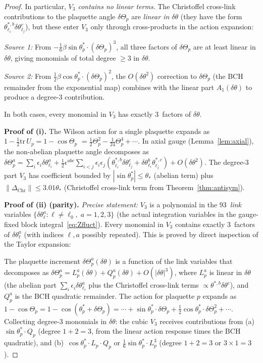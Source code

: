 \documentclass[11pt]{article}
\theoremstyle{definition}
\newcommand{\tr}{\mathrm{tr}}
\begin{document}
\begin{proof}
In particular, \emph{$V_3$ contains no linear terms}.
The Christoffel cross-link contributions to the plaquette angle
$\delta\Theta_p$ are \emph{linear in $\delta\theta$}
(they have the form $\theta^{*,b}_{\ell_i}\delta\theta^c_{\ell_j}$),
but these enter $V_3$ only through cross-products in the action
expansion:

\emph{Source 1:} From
$-\tfrac{1}{6}\beta\sin\theta_p^*\cdot(\delta\Theta_p)^3$,
all three factors of $\delta\Theta_p$ are at least linear in
$\delta\theta$, giving monomials of total degree $\ge 3$ in
$\delta\theta$.

\emph{Source 2:} From
$\tfrac{1}{2}\beta\cos\theta_p^*\cdot(\delta\Theta_p)^2$,
the $O(\delta\theta^2)$ correction to
$\delta\Theta_p$ (the BCH remainder from the exponential map)
combines with the linear part $A_1(\delta\theta)$ to produce
a degree-3 contribution.

In both cases, every monomial in $V_3$ has exactly 3~factors of
$\delta\theta$.

\textbf{Proof of (i).}
The Wilson action for a single plaquette expands as
$1-\frac{1}{2}\tr\,U_p=1-\cos\Theta_p$
$=\frac{1}{2}\Theta_p^2-\frac{1}{24}\Theta_p^4+\cdots$.
In axial gauge (Lemma~\ref{lem:axial}), the non-abelian plaquette
angle decomposes as
$\delta\Theta_p^a=\sum_i\epsilon_i\delta\theta_{\ell_i}^a
+\frac{1}{2}\epsilon^{abc}\sum_{i<j}\epsilon_i\epsilon_j
(\theta_{\ell_i}^{*,b}\delta\theta_{\ell_j}^c
+\delta\theta_{\ell_i}^b\theta_{\ell_j}^{*,c})
+O(\delta\theta^2)$.
The degree-3 part $V_3$ has coefficient bounded by
$|\sin\theta_p^*|\le\theta_*$ (abelian term) plus
$\|\Delta_{\mathrm{Chr}}\|\le 3.01\theta_*$ (Christoffel cross-link
term from Theorem~\ref{thm:antisym}).

\textbf{Proof of (ii) (parity).}
\emph{Precise statement:} $V_3$ is a polynomial in the
93~\emph{link} variables
$\{\delta\theta_\ell^a:\ell\ne\ell_0,\;a=1,2,3\}$ (the
actual integration variables in the gauge-fixed block
integral~\eqref{eq:Zfluct}).  Every monomial in $V_3$
contains exactly 3~factors of $\delta\theta_\ell^a$ (with
indices $\ell,a$ possibly repeated).  This is proved
by direct inspection of the Taylor expansion:

The plaquette increment
$\delta\Theta_p^a(\delta\theta)$ is a function of the link
variables that decomposes as
$\delta\Theta_p^a=L_p^a(\delta\theta)+Q_p^a(\delta\theta)
+O(|\delta\theta|^3)$,
where $L_p^a$ is linear in $\delta\theta$ (the abelian part
$\sum_i\epsilon_i\delta\theta_{\ell_i}^a$ plus the
Christoffel cross-link terms
$\propto\theta^{*,b}\delta\theta^c$), and $Q_p^a$ is the
BCH quadratic remainder.  The action for plaquette $p$ expands as
$1-\cos\Theta_p=1-\cos(\theta_p^*+\delta\Theta_p)
=\cdots+\sin\theta_p^*\cdot\delta\Theta_p
+\frac{1}{2}\cos\theta_p^*\cdot\delta\Theta_p^2+\cdots$.
Collecting degree-3 monomials in $\delta\theta$:
the cubic $V_3$ receives contributions from
(a)~$\sin\theta_p^*\cdot Q_p$ (degree $1+2=3$, from the
linear action response times the BCH quadratic), and
(b)~$\cos\theta_p^*\cdot L_p\cdot Q_p$ or
$\frac{1}{6}\sin\theta_p^*\cdot L_p^3$ (degree $1+2=3$ or
$3\times 1=3$).


\end{proof}
\end{document}
